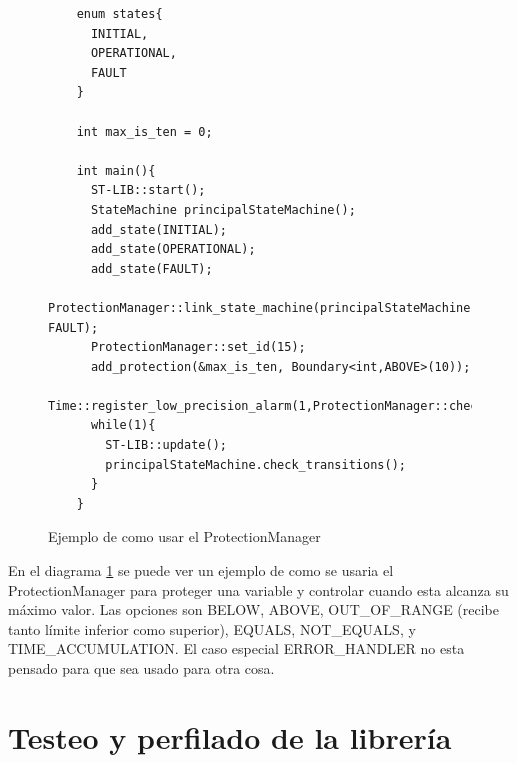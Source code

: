 \documentclass{report}
\begin{document}
\begin{figure}[h]
  \begin{lstlisting}
    enum states{
      INITIAL,
      OPERATIONAL,
      FAULT
    }

    int max_is_ten = 0;

    int main(){
      ST-LIB::start();
      StateMachine principalStateMachine();
      add_state(INITIAL);
      add_state(OPERATIONAL);
      add_state(FAULT);
      ProtectionManager::link_state_machine(principalStateMachine, FAULT);
      ProtectionManager::set_id(15);
      add_protection(&max_is_ten, Boundary<int,ABOVE>(10));
      Time::register_low_precision_alarm(1,ProtectionManager::check_protections());
      while(1){
        ST-LIB::update();
        principalStateMachine.check_transitions();
      }
    }
  \end{lstlisting}
  \caption{Ejemplo de como usar el ProtectionManager}
  \label{ProtectionManagerCode}
\end{figure}
\par \vspace{0.3cm}
En el diagrama \ref{ProtectionManagerCode} se puede ver un ejemplo de como se usaria el ProtectionManager para proteger una variable y controlar cuando esta alcanza su máximo valor. Las opciones son BELOW, ABOVE, OUT\_OF\_RANGE (recibe tanto límite inferior como superior), EQUALS, NOT\_EQUALS, y TIME\_ACCUMULATION. El caso especial ERROR\_HANDLER no esta pensado para que sea usado para otra cosa.



\newpage

\section{Testeo y perfilado de la librería}
\end{document}
